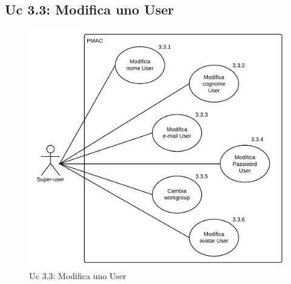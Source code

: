 \documentclass[10pt,a4paper]{article}
\begin{document}
\subsection{Uc 3.3: Modifica uno User}
\begin{figure}[ht]
\centering
\caption{Uc 3.3: Modifica uno User}
\includegraphics[scale=0.9]{UseCase/Uc3_3} %
\end{figure}
\end{document}
